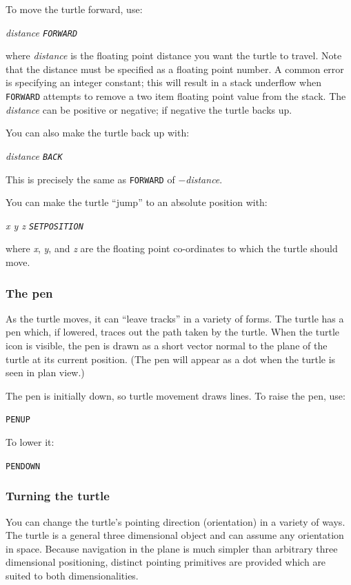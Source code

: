 \documentclass{article}
\begin{document}
To move the turtle forward, use:

{\em distance {\tt FORWARD}}

where {\em distance} is the floating point distance you want the
turtle to travel.  Note that the distance must be specified as a
floating point number.  A common error is specifying an integer
constant; this will result in a stack underflow when {\tt FORWARD}
attempts to remove a two item floating point value from the stack.
The {\em distance} can be positive or negative; if negative the turtle
backs up.

You can also make the turtle back up with:

{\em distance {\tt BACK}}

This is precisely the same as {\tt FORWARD} of $-${\em distance}.

You can make the turtle ``jump'' to an absolute position with:

{\em x y z {\tt SETPOSITION}}

where {\em x}, {\em y}, and {\em z} are the floating point
co-ordinates to which the turtle should move.

\subsubsection{The pen}

As the turtle moves, it can ``leave tracks'' in a variety of forms.
The turtle has a pen which, if lowered, traces out the path taken by
the turtle.  When the turtle icon is visible, the pen is drawn as a
short vector normal to the plane of the turtle at its current
position.  (The pen will appear as a dot when the turtle is seen in
plan view.)

The pen is initially down, so turtle movement draws lines.  To raise
the pen, use:

{\tt PENUP}

To lower it:

{\tt PENDOWN}

\subsubsection{Turning the turtle}

You can change the turtle's pointing direction (orientation) in a
variety of ways.  The turtle is a general three dimensional object and
can assume any orientation in space.  Because navigation in the plane
is much simpler than arbitrary three dimensional positioning, distinct pointing
primitives are provided which are suited to both dimensionalities.
\end{document}
